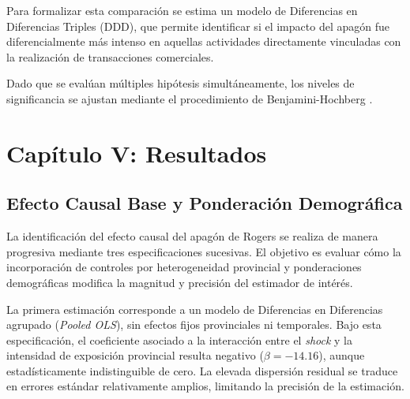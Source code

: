 Para formalizar esta comparaci\'on se estima un modelo de Diferencias en Diferencias Triples (DDD), que permite identificar si el impacto del apag\'on fue diferencialmente m\'as intenso en aquellas actividades directamente vinculadas con la realizaci\'on de transacciones comerciales.

Dado que se eval\'uan m\'ultiples hip\'otesis simult\'aneamente, los niveles de significancia se ajustan mediante el procedimiento de Benjamini-Hochberg \citep{benjamini1995}.

\newpage
\section{Cap\'itulo V: Resultados}

\subsection{Efecto Causal Base y Ponderaci\'on Demogr\'afica}
\label{sec:5_1}

La identificaci\'on del efecto causal del apag\'on de Rogers se realiza de manera progresiva mediante tres especificaciones sucesivas. El objetivo es evaluar c\'omo la incorporaci\'on de controles por heterogeneidad provincial y ponderaciones demogr\'aficas modifica la magnitud y precisi\'on del estimador de int\'er\'es.

La primera estimaci\'on corresponde a un modelo de Diferencias en Diferencias agrupado (\textit{Pooled OLS}), sin efectos fijos provinciales ni temporales. Bajo esta especificaci\'on, el coeficiente asociado a la interacci\'on entre el \textit{shock} y la intensidad de exposici\'on provincial resulta negativo ($\beta = -14.16$), aunque estad\'isticamente indistinguible de cero. La elevada dispersi\'on residual se traduce en errores est\'andar relativamente amplios, limitando la precisi\'on de la estimaci\'on.

